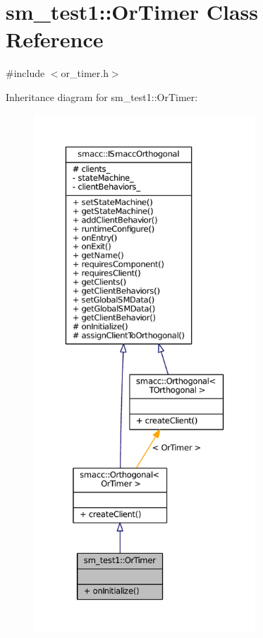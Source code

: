 \hypertarget{classsm__test1_1_1OrTimer}{}\section{sm\+\_\+test1\+:\+:Or\+Timer Class Reference}
\label{classsm__test1_1_1OrTimer}


{\ttfamily \#include $<$or\+\_\+timer.\+h$>$}



Inheritance diagram for sm\+\_\+test1\+:\+:Or\+Timer\+:
\nopagebreak
\begin{figure}[H]
\begin{center}
\leavevmode
\includegraphics[height=550pt]{classsm__test1_1_1OrTimer__inherit__graph}
\end{center}
\end{figure}


